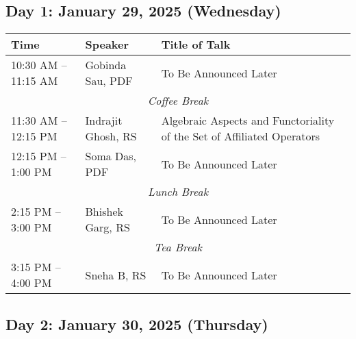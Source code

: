 %
%
\subsection*{Day 1: January 29, 2025 (Wednesday)}

\noindent
\renewcommand{\arraystretch}{1.5} %
\begin{tabular}{|p{3.5cm}|p{4cm}|p{7cm}|}
	\hline
	\textbf{Time} & \textbf{Speaker} & \textbf{Title of Talk} \\
	\hline
	10:30 AM -- 11:15 AM & Gobinda Sau, PDF & To Be Announced Later \\
	\hline
	\multicolumn{3}{|c|}{\textit{Coffee Break}} \\
	\hline
    11:30 AM -- 12:15 PM & Indrajit Ghosh, RS & Algebraic Aspects and Functoriality of the Set of Affiliated Operators \\
	\hline
	12:15 PM -- 1:00 PM & Soma Das, PDF & To Be Announced Later \\
	\hline
	\multicolumn{3}{|c|}{\textit{Lunch Break}} \\
	\hline
	2:15 PM -- 3:00 PM & Bhishek Garg, RS & To Be Announced Later \\
	\hline
	\multicolumn{3}{|c|}{\textit{Tea Break}} \\
	\hline
	3:15 PM -- 4:00 PM & Sneha B, RS & To Be Announced Later \\
	\hline

\end{tabular}


\subsection*{Day 2: January 30, 2025 (Thursday)}

